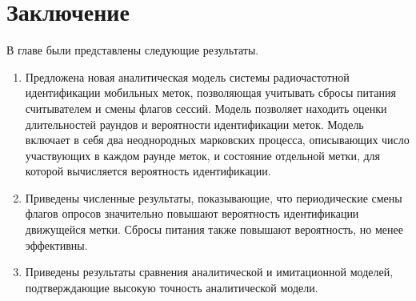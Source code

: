 \section{Заключение}\label{sec:ch3_conclusion}
В главе были представлены следующие результаты.

\begin{enumerate}
\item Предложена новая аналитическая модель системы радиочастотной идентификации мобильных меток, позволяющая учитывать сбросы питания считывателем и смены флагов сессий. Модель позволяет находить оценки длительностей раундов и вероятности идентификации меток. Модель включает в себя два неоднородных марковских процесса, описывающих число участвующих в каждом раунде меток, и состояние отдельной метки, для которой вычисляется вероятность идентификации.
\item Приведены численные результаты, показывающие, что периодические смены флагов опросов значительно повышают вероятность идентификации движущейся метки. Сбросы питания также повышают вероятность, но менее эффективны.
\item Приведены результаты сравнения аналитической и имитационной моделей, подтверждающие высокую точность аналитической модели.
\end{enumerate}

\clearpage
